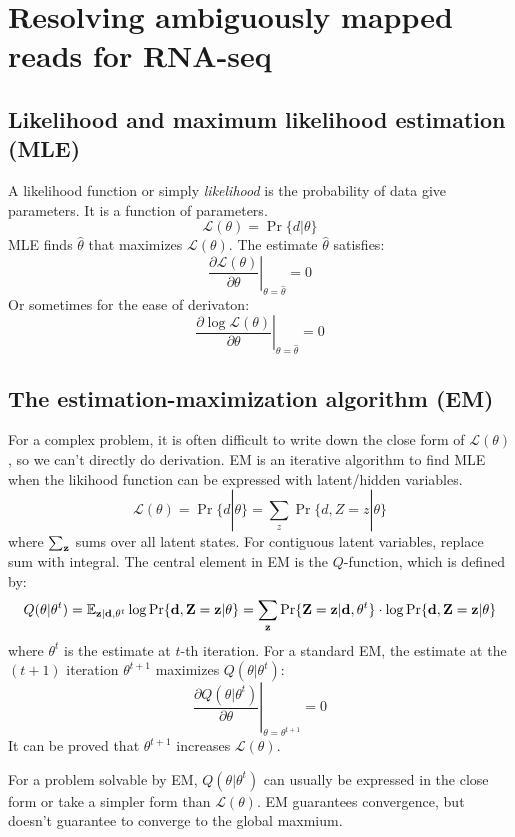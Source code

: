 \documentclass[10pt]{article}
\begin{document}
\section{Resolving ambiguously mapped reads for RNA-seq}

\subsection{Likelihood and maximum likelihood estimation (MLE)}

A likelihood function or simply \emph{likelihood} is the probability of data
give parameters. It is a function of parameters.
$$
\mathcal{L}(\theta)=\Pr\{d|\theta\}
$$
MLE finds $\hat{\theta}$ that maximizes $\mathcal{L}(\theta)$.  The estimate
$\hat{\theta}$ satisfies:
$$
\left.\frac{\partial \mathcal{L}(\theta)}{\partial\theta}\right|_{\theta=\hat{\theta}}=0
$$
Or sometimes for the ease of derivaton:
$$
\left.\frac{\partial \log\mathcal{L}(\theta)}{\partial\theta}\right|_{\theta=\hat{\theta}}=0
$$

\subsection{The estimation-maximization algorithm (EM)}

For a complex problem, it is often difficult to write down the close form of
$\mathcal{L}(\theta)$, so we can't directly do derivation. EM is an iterative
algorithm to find MLE when the likihood function can be expressed with
latent/hidden variables.
$$
\mathcal{L}(\theta)=\Pr\{d|\theta\}=\sum_z\Pr\{d,Z=z|\theta\}
$$
where $\sum_{\bf z}$ sums over all latent states. For contiguous latent
variables, replace sum with integral. The central element in EM is the
$Q$-function, which is defined by:
$$
Q(\theta|\theta^t)=\mathbb{E}_{{\bf z}|{\bf d},\theta^t}\log\Pr\{{\bf d},{\bf Z}={\bf z}|\theta\}=\sum_{{\bf z}}\Pr\{{\bf Z}={\bf z}|{\bf d},\theta^t\}\cdot\log\Pr\{{\bf d},{\bf Z}={\bf z}|\theta\}
$$
where $\theta^t$ is the estimate at $t$-th iteration. For a standard EM, the
estimate at the $(t+1)$ iteration $\theta^{t+1}$ maximizes $Q(\theta|\theta^t)$:
$$
\left.\frac{\partial Q(\theta|\theta^t)}{\partial\theta}\right|_{\theta=\theta^{t+1}}=0
$$
It can be proved that $\theta^{t+1}$ increases $\mathcal{L}(\theta)$.

For a problem solvable by EM, $Q(\theta|\theta^t)$ can usually be expressed in
the close form or take a simpler form than $\mathcal{L}(\theta)$. EM guarantees
convergence, but doesn't guarantee to converge to the global maxmium.
\end{document}
